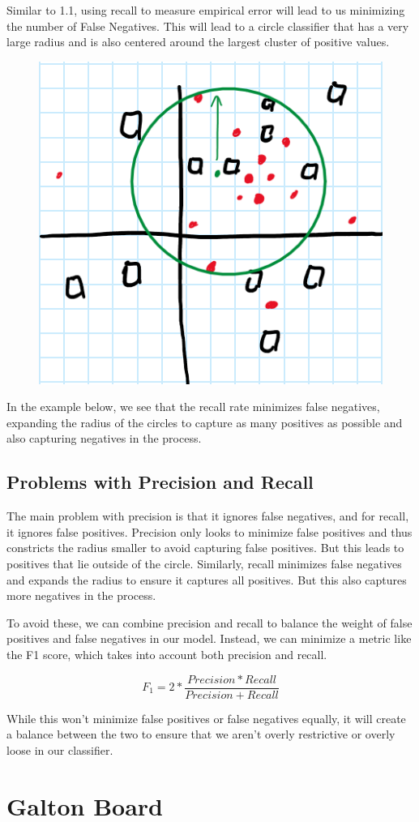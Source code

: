\documentclass{article}
\begin{document}
\noindent
Similar to 1.1, using recall to measure empirical error will lead to us minimizing the number of False Negatives. This will lead to a circle classifier that has a very large radius and is also centered around the largest cluster of positive values.

\begin{figure}[ht]
\centering
\includegraphics[width=0.35\linewidth]{Recall Figure.png}
\end{figure}

In the example below, we see that the recall rate minimizes false negatives, expanding the radius of the circles to capture as many positives as possible and also capturing negatives in the process.
\newpage
\subsection{Problems with Precision and Recall}
The main problem with precision is that it ignores false negatives, and for recall, it ignores false positives. Precision only looks to minimize false positives and thus constricts the radius smaller to avoid capturing false positives. But this leads to positives that lie outside of the circle. Similarly, recall minimizes false negatives and expands the radius to ensure it captures all positives. But this also captures more negatives in the process.

To avoid these, we can combine precision and recall to balance the weight of false positives and false negatives in our model. Instead, we can minimize a metric like the F1 score, which takes into account both precision and recall.

\[F_1 = 2 * \frac{Precision * Recall}{Precision + Recall}\]

While this won't minimize false positives or false negatives equally, it will create a balance between the two to ensure that we aren't overly restrictive or overly loose in our classifier.

\newpage
\section{Galton Board}
\end{document}
